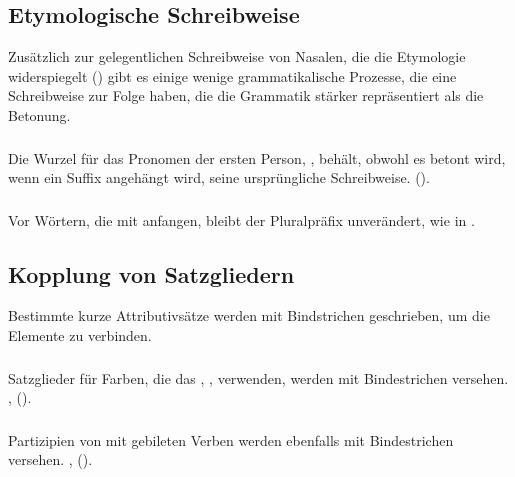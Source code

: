 \subsection{Etymologische Schreibweise} Zus\"atzlich zur gelegentlichen Schreibweise
von Nasalen, die die Etymologie widerspiegelt ()
gibt es einige wenige grammatikalische Prozesse, die eine Schreibweise zur
Folge haben, die die Grammatik st\"arker repr\"asentiert als die Betonung.

\subsubsection{} Die Wurzel f\"ur das Pronomen der ersten Person, , beh\"alt,
obwohl es  betont wird, wenn ein Suffix angeh\"angt wird, seine urspr\"ungliche
Schreibweise. ().

\subsubsection{} Vor W\"ortern, die mit  anfangen, bleibt der Pluralpr\"afix 
unver\"andert, wie in .

\subsection{Kopplung von Satzgliedern} Bestimmte kurze Attributivs\"atze werden
mit Bindstrichen geschrieben, um die Elemente zu verbinden.

\subsubsection{} Satzglieder f\"ur Farben, die das , , verwenden,
werden mit Bindestrichen versehen. , 
().

\subsubsection{} Partizipien von mit  gebileten Verben werden ebenfalls mit
Bindestrichen versehen. , 
().